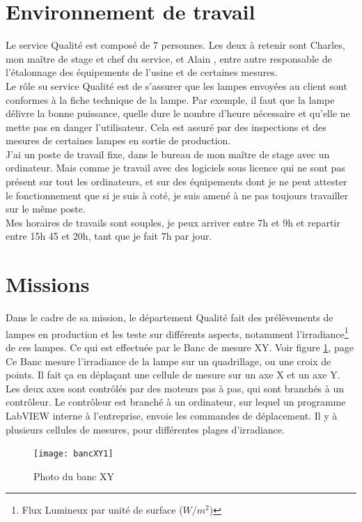 \documentclass[12pt]{article}
\begin{document}
\section{Environnement de travail}

Le service Qualité est composé de 7 personnes. Les deux à retenir sont Charles, mon maître de stage et chef du service, et Alain , entre autre responsable de l'étalonnage des équipements de l'usine et de certaines mesures.\\
Le rôle su service Qualité est de s'assurer que les lampes envoyées au client sont conformes à la fiche technique de la lampe.
Par exemple, il faut que la lampe délivre la bonne puissance, quelle dure le nombre d'heure nécessaire et qu'elle ne mette pas en danger l'utilisateur.
Cela est assuré par des inspections et des mesures de certaines lampes en sortie de production.\\
J'ai un poste de travail fixe, dans le bureau de mon maître de stage avec un ordinateur.
Mais comme je travail avec des logiciels sous licence qui ne sont pas présent sur tout les ordinateurs, et sur des équipements dont je ne peut attester le fonctionnement que si je suis à coté, je suis amené à ne pas toujours travailler sur le même poste.\\
Mes horaires de travails sont souples, je peux arriver entre 7h et 9h et repartir entre 15h 45 et 20h, tant que je fait 7h par jour.
\newpage

\section{Missions}


Dans le cadre de sa mission, le département Qualité fait des prélèvements de lampes en production et les teste sur différents aspects, notamment l'irradiance\footnote{Flux Lumineux par unité de surface ($W/m^2$)} de ces lampes.
Ce qui est effectuée par le Banc de mesure XY.
Voir figure \ref{fig:bancXY1}, page \pageref{fig:bancXY1}\\
Ce Banc mesure l'irradiance de la lampe sur un quadrillage, ou une croix de points.
Il fait ça en déplaçant une cellule de mesure sur un axe X et un axe Y.
Les deux axes sont contrôlés par des moteurs pas à pas, qui sont branchés à un contrôleur.
Le contrôleur est branché à un ordinateur, sur lequel un programme LabVIEW interne à l'entreprise, envoie les commandes de déplacement.
Il y à plusieurs cellules de mesures, pour différentes plages d'irradiance.\\
\begin{figure}[htb]
	\centering
	\texttt{[image: bancXY1]}
	\caption{Photo du banc XY}
	\label{fig:bancXY1}
\end{figure}
\end{document}
